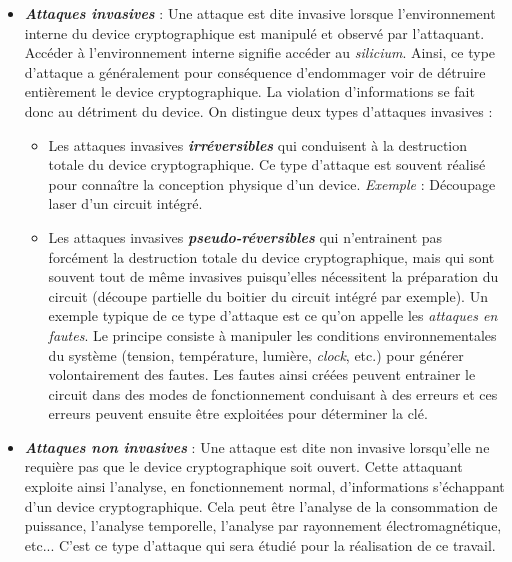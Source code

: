 \documentclass[oneside]{book}
\begin{document}
\begin{itemize}
\item \textbf{\textit{Attaques invasives}} : Une attaque est dite invasive \cite{peeters_advanced_2013} lorsque l'environnement interne du device cryptographique est manipulé et observé par l'attaquant. Accéder à l'environnement interne signifie accéder au \textit{silicium}. Ainsi, ce type d'attaque a généralement pour conséquence d'endommager voir de détruire entièrement le device cryptographique. La violation d'informations se fait donc au détriment du device. On distingue deux types d'attaques invasives : 
\begin{itemize}
\item Les attaques invasives \textbf{\textit{irréversibles}} qui conduisent à la destruction totale du device cryptographique. Ce type d'attaque est souvent réalisé pour connaître la conception physique d'un device. \textit{Exemple} : Découpage laser d’un circuit intégré.
\item Les attaques invasives \textbf{\textit{pseudo-réversibles}} qui n’entrainent pas forcément la destruction totale du device cryptographique, mais qui sont souvent tout de même invasives puisqu’elles nécessitent la préparation du circuit (découpe partielle du boitier du circuit intégré par exemple). Un exemple typique de ce type d'attaque est ce qu'on appelle les \textit{attaques en fautes}. Le principe consiste à manipuler les conditions environnementales du système (tension, température, lumière, \textit{clock}, etc.) pour générer volontairement des fautes. Les fautes ainsi créées peuvent entrainer le circuit dans des modes de fonctionnement conduisant à des erreurs et ces erreurs peuvent ensuite être exploitées pour déterminer la clé.
\end{itemize}
\item \textbf{\textit{Attaques non invasives}} : Une attaque est dite non invasive \cite{peeters_advanced_2013} lorsqu'elle ne requière pas que le device cryptographique soit ouvert. Cette attaquant exploite ainsi l'analyse, en fonctionnement normal, d'informations s'échappant d'un device cryptographique. Cela peut être l'analyse de la consommation de puissance, l'analyse temporelle, l'analyse par rayonnement électromagnétique, etc... C'est ce type d'attaque qui sera étudié pour la réalisation de ce travail. \\
\end{itemize}
\end{document}
